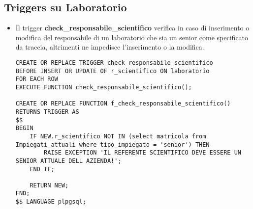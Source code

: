 \subsection{Triggers su Laboratorio}
    \begin{itemize}

  
\normalsize
\item Il trigger \textbf{check\_responsabile\_scientifico} verifica in caso di inserimento o modifica del responsabile di un laboratorio che sia un senior come specificato da traccia, altrimenti ne impedisce l'inserimento o la modifica.
\scriptsize
\begin{lstlisting}
CREATE OR REPLACE TRIGGER check_responsabile_scientifico
BEFORE INSERT OR UPDATE OF r_scientifico ON laboratorio
FOR EACH ROW
EXECUTE FUNCTION check_responsabile_scientifico();

CREATE OR REPLACE FUNCTION f_check_responsabile_scientifico() RETURNS TRIGGER AS
$$
BEGIN
	IF NEW.r_scientifico NOT IN (select matricola from Impiegati_attuali where tipo_impiegato = 'senior') THEN
		RAISE EXCEPTION 'IL REFERENTE SCIENTIFICO DEVE ESSERE UN SENIOR ATTUALE DELL AZIENDA!';
	END IF;

	RETURN NEW;
END;
$$ LANGUAGE plpgsql;
\end{lstlisting}

\end{itemize}
\newpage




